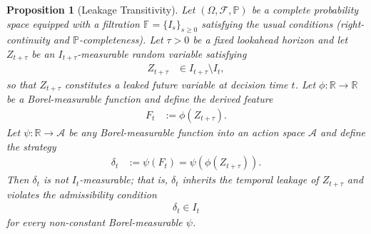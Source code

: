\documentclass[12pt,openany]{book}
\newcommand{\calF}{\mathcal{F}}
\newcommand{\calI}{\mathcal{I}}
\numberwithin{equation}{chapter}
\theoremstyle{plain}
\newtheorem{proposition}[theorem]{Proposition}
\theoremstyle{definition}
\theoremstyle{remark}
\numberwithin{equation}{chapter}
\theoremstyle{plain}
\def\calI{I}%
\begin{document}
\begin{proposition}[Leakage Transitivity]
\label{prop:leakage-transitivity}
Let $(\Omega, \calF, \mathbb{P})$ be a complete probability space
equipped with a filtration $\mathbb{F} = \{\calI_s\}_{s \geq 0}$
satisfying the usual conditions (right-continuity and
$\mathbb{P}$-completeness).  Let $\tau > 0$ be a fixed lookahead
horizon and let $Z_{t+\tau}$ be an $\calI_{t+\tau}$-measurable
random variable satisfying
\begin{align}
  Z_{t+\tau} &\in \calI_{t+\tau} \setminus \calI_t,
  \label{eq:lt-leak-hyp}
\end{align}
so that $Z_{t+\tau}$ constitutes a \emph{leaked} future variable
at decision time $t$.  Let $\phi : \mathbb{R} \to \mathbb{R}$ be a
Borel-measurable function and define the derived feature
\begin{align}
  F_t &:= \phi(Z_{t+\tau}).
  \label{eq:lt-feature-def}
\end{align}
Let $\psi : \mathbb{R} \to \mathcal{A}$ be any Borel-measurable
function into an action space $\mathcal{A}$ and define the strategy
\begin{align}
  \delta_t &:= \psi(F_t) = \psi\!\left(\phi(Z_{t+\tau})\right).
  \label{eq:lt-strategy-def}
\end{align}
Then $\delta_t$ is \emph{not} $\calI_t$-measurable; that is,
$\delta_t$ inherits the temporal leakage of $Z_{t+\tau}$ and
violates the admissibility condition
\begin{align}
  \delta_t \in \calI_t
  \label{eq:lt-admissibility}
\end{align}
for every non-constant Borel-measurable $\psi$.
\end{proposition}
\end{document}
